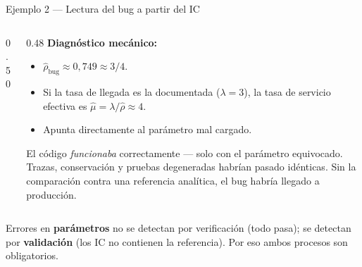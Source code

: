 \documentclass[aspectratio=1610, 10pt]{beamer}
\begin{document}
\begin{frame}{Ejemplo 2 — Lectura del bug a partir del IC}
  \begin{columns}[T]
    \begin{column}{0.50\textwidth}
    \end{column}
    \begin{column}{0.48\textwidth}
      \footnotesize
      \textbf{Diagnóstico mecánico:}
      \begin{itemize}\itemsep1pt
        \item $\hat\rho_{\text{bug}} \approx 0{,}749 \approx 3/4$.
        \item Si la tasa de llegada es la documentada ($\lambda=3$),
          la tasa de servicio efectiva es $\hat\mu=\lambda/\hat\rho\approx 4$.
        \item Apunta directamente al parámetro mal cargado.
      \end{itemize}

      \vspace{4pt}
      \begin{alertabox}
        \footnotesize
        El código \emph{funcionaba} correctamente — solo con el parámetro equivocado.
        Trazas, conservación y pruebas degeneradas habrían pasado idénticas.
        Sin la comparación contra una referencia analítica, el bug habría llegado
        a producción.
      \end{alertabox}
    \end{column}
  \end{columns}

  \vspace{4pt}
  \begin{resultadobox}
    \footnotesize
    Errores en \textbf{parámetros} no se detectan por verificación (todo pasa);
    se detectan por \textbf{validación} (los IC no contienen la referencia).
    Por eso ambos procesos son obligatorios.
  \end{resultadobox}
\end{frame}
\end{document}
